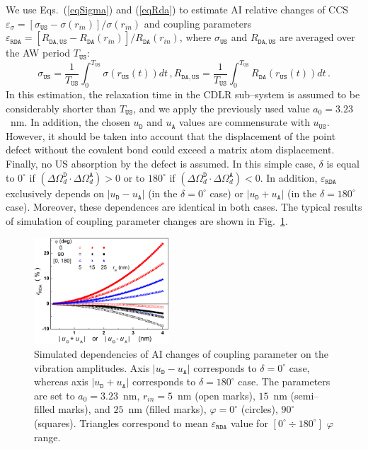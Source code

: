 \documentclass[aip,jap, amsmath,amssymb,reprint]{revtex4-1}
\begin{document}
We use Eqs.~(\ref{eqSigma}) and (\ref{eqRda}) to estimate AI relative changes of CCS
$\varepsilon_\sigma=[\sigma_{\mathtt{US}}-\sigma(r_{in})]/\sigma(r_{in})$
and coupling parameters $\varepsilon_{\mathtt{RDA}}=[R_{\mathtt{DA,US}}-R_\mathtt{DA}(r_{in})]/R_\mathtt{DA}(r_{in})$,
where $\sigma_{\mathtt{US}}$ and $R_{\mathtt{DA,US}}$ are averaged over the AW period $T_\mathtt{US}$:
\begin{equation*}
\label{eqAver}
\sigma_{\mathtt{US}}=\frac{1}{T_\mathtt{US}}\int^{T_\mathtt{US}}_0\!\!\!\!\!\!\sigma(r_\mathtt{US}(t))dt\,,
R_{\mathtt{DA,US}}=\frac{1}{T_\mathtt{US}}\int^{T_\mathtt{US}}_0\!\!\!\!\!\!R_{\mathtt{DA}}(r_\mathtt{US}(t))dt\,.
\end{equation*}
In this estimation, the relaxation time in the CDLR sub--system is assumed to be considerably shorter than $T_\mathtt{US}$,
and we apply the previously used\cite{CDLR:JAP} value $a_0=3.23$~nm.
In addition, the chosen $u_\mathtt{D}$ and $u_\mathtt{A}$ values are commensurate with $u_\mathtt{US}$.
However, it should be taken into account that the displacement of the point defect without the covalent bond could exceed a matrix atom displacement.
Finally, no US  absorption by the defect is assumed.
In this simple case, $\delta$ is equal to $0^\circ$ if $(\Delta\Omega_d^\mathtt{D}\cdot\Delta\Omega_d^\mathtt{A})>0$
or to $180^\circ$ if $(\Delta\Omega_d^\mathtt{D}\cdot\Delta\Omega_d^\mathtt{A})<0$.
In addition, $\varepsilon_{\mathtt{RDA}}$ exclusively depends on
$|u_\mathtt{D}-u_\mathtt{A}|$ (in the $\delta=0^\circ$ case) or $|u_\mathtt{D}+u_\mathtt{A}|$ (in the $\delta=180^\circ$ case).
Moreover, these dependences are identical in both cases.
The typical results of simulation of coupling parameter changes are shown in  Fig.~\ref{fig_Erda}.

\begin{figure}
\includegraphics[width=0.45\textwidth]{fig_6}%
\caption{\label{fig_Erda}
Simulated dependencies of AI changes of coupling parameter on the vibration amplitudes.
Axis $|u_\mathtt{D}-u_\mathtt{A}|$ corresponds to $\delta=0^\circ$ case, whereas axis $|u_\mathtt{D}+u_\mathtt{A}|$ corresponds to $\delta=180^\circ$ case.
The parameters are set to $a_0=3.23$~nm,
$r_{in}=5$~nm (open marks), $15$~nm (semi--filled marks), and $25$~nm (filled marks),
$\varphi=0^\circ$ (circles), $90^\circ$ (squares).
Triangles correspond to mean $\varepsilon_{\mathtt{RDA}}$ value for $[0^\circ\div 180^\circ]$ $\varphi$ range.
}%
\end{figure}
\end{document}
